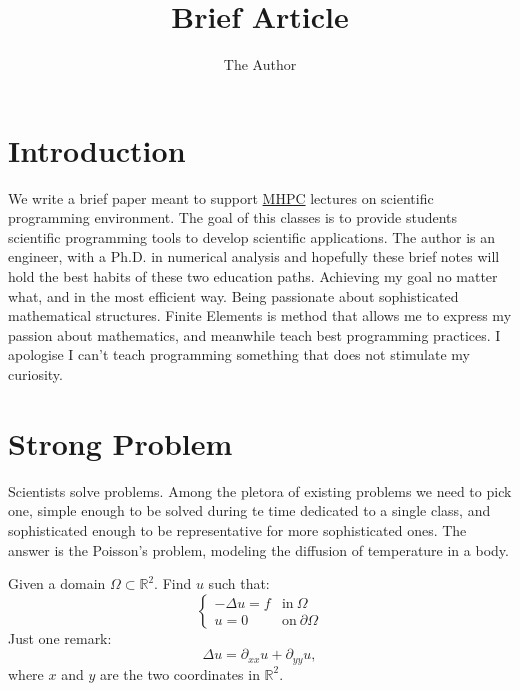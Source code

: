 \documentclass[11pt]{amsart}
\title{Brief Article}
\author{The Author}
\begin{document}
\renewcommand{\theFancyVerbLine}{
  \sffamily\textcolor[rgb]{0.5,0.5,0.5}{\scriptsize\arabic{FancyVerbLine}}}
\maketitle

\section{Introduction}
We write a brief paper meant to support \href{http://www.mhpc.it/}{MHPC} 
lectures on scientific programming environment. The goal of this classes 
is to provide students scientific programming tools to develop scientific applications. 
The author is an engineer, with a Ph.D. in numerical analysis and hopefully these brief 
notes will hold the best habits of these two education paths. Achieving my goal no 
matter what, and in the most efficient way. Being passionate about sophisticated 
mathematical structures. Finite Elements is method that allows me to express my passion 
about mathematics, and meanwhile teach best programming practices. I apologise 
I can't teach programming something that does not stimulate my curiosity.

\section{Strong Problem}
Scientists solve problems. Among the pletora of existing problems 
we need to pick one, simple enough to be solved during te time dedicated to a single 
class, and sophisticated enough to be representative for more sophisticated ones. 
The answer is the Poisson's problem,
modeling the diffusion of temperature in a body.

Given a domain $\Omega\subset \mathbb{R}^2$.
Find $u$ such that:
\[
\left\{
\begin{array}{ll}
-\Delta u = f & \mathrm{in}\ \Omega \\
u = 0  & \mathrm{on}\ \partial\Omega
\end{array}
\right.
\]
Just one remark:
\[
\Delta u = \partial_{xx} u + \partial_{yy} u,
\]
where $x$ and $y$ are the two coordinates in $\mathbb{R}^2$.
\end{document}
